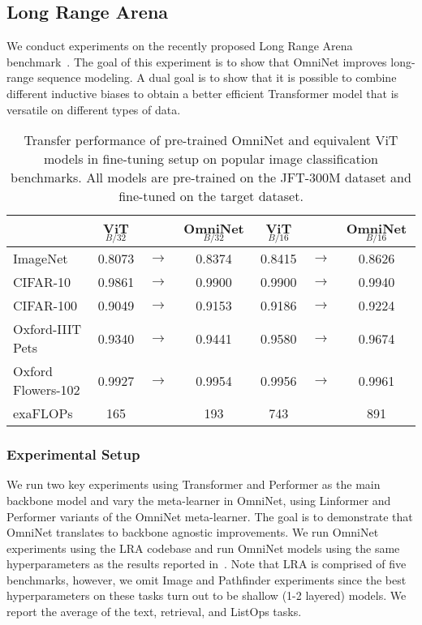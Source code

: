 \documentclass{article}
\begin{document}
\subsection{Long Range Arena}
We conduct experiments on the recently proposed Long Range Arena benchmark~\citep{tay2020long}. The goal of this experiment is to show that OmniNet improves long-range sequence modeling. A dual goal is  to show that it is possible to combine different inductive biases to obtain a better efficient Transformer model that is versatile on different types of data.

\begin{table*}
\vspace{-10pt}
\centering
\caption{Transfer performance of pre-trained OmniNet and equivalent ViT models in fine-tuning setup on popular image classification benchmarks. All models are pre-trained on the JFT-300M dataset and fine-tuned on the target dataset.}
\begin{tabular}{l c @{}p{0.2cm}@{} c | c @{}p{0.2cm}@{} c}
\toprule
   & ViT$_{B/32}$ &  & OmniNet$_{B/32}$ & ViT$_{B/16}$ &  & OmniNet$_{B/16}$ \\ 
\midrule 
ImageNet &  0.8073 & 	$\rightarrow$  & 0.8374 &  
            0.8415 & 	$\rightarrow$  & 0.8626 \\
CIFAR-10 &  0.9861 & 	$\rightarrow$  & 0.9900 &  
            0.9900 & 	$\rightarrow$  & 0.9940   \\
CIFAR-100 &  0.9049 & 	$\rightarrow$  & 0.9153 &  
            0.9186 & 	$\rightarrow$  & 0.9224  \\
Oxford-IIIT Pets &  0.9340 & 	$\rightarrow$  &0.9441  &  
                    0.9580 & 	$\rightarrow$  &0.9674  \\
Oxford Flowers-102 & 0.9927 & 	$\rightarrow$  &0.9954 & 
                     0.9956  & 	$\rightarrow$  &0.9961 \\
\midrule 
exaFLOPs  & 165 && 193 &  743 && 891 \\
\bottomrule
\end{tabular}
\label{tbl:OmniNet-ViT-fineting}
\end{table*}

\subsubsection{Experimental Setup}
We run two key experiments using Transformer and Performer as the main backbone model and vary the meta-learner in OmniNet, using Linformer and Performer variants of the OmniNet meta-learner. The goal is to demonstrate that OmniNet translates to backbone agnostic improvements. We run OmniNet experiments using the LRA codebase and run OmniNet models using the same hyperparameters as the results reported in~\citep{tay2020long}. Note that LRA is comprised of five benchmarks, however, we omit Image and Pathfinder experiments since the best hyperparameters on these tasks turn out to be shallow (1-2 layered) models. We report the average of the text, retrieval, and ListOps tasks. 
\end{document}
